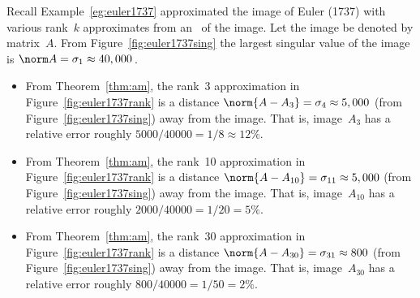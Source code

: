 \begin{example} \label{eg:}
Recall Example~\ref{eg:euler1737} approximated the image of Euler (1737) with various rank~\(k\) approximates from an \svd\ of the image.
Let the image be denoted by matrix~\(A\).
From Figure~\ref{fig:euler1737sing} the largest singular value of the image is \(\norm A=\sigma_1\approx40,000\)\,.
\begin{itemize}
\item From  Theorem~\ref{thm:am}, the rank~3 approximation in Figure~\ref{fig:euler1737rank} is a distance \(\norm{A-A_3}=\sigma_4\approx 5,000\) (from Figure~\ref{fig:euler1737sing}) away from the image.  
That is, image~\(A_3\) has a relative error roughly \(5000/40000=1/8\approx 12\%\).
\item From  Theorem~\ref{thm:am}, the rank~10 approximation in Figure~\ref{fig:euler1737rank} is a distance \(\norm{A-A_{10}}=\sigma_{11}\approx 5,000\) (from Figure~\ref{fig:euler1737sing}) away from the image.  
That is, image~\(A_{10}\) has a relative error roughly \(2000/40000=1/20= 5\%\). 
\item From  Theorem~\ref{thm:am}, the rank~30 approximation in Figure~\ref{fig:euler1737rank} is a distance \(\norm{A-A_{30}}=\sigma_{31}\approx 800\) (from Figure~\ref{fig:euler1737sing}) away from the image.  
That is, image~\(A_{30}\) has a relative error roughly \(800/40000=1/50= 2\%\). 
\end{itemize}
\end{example}


